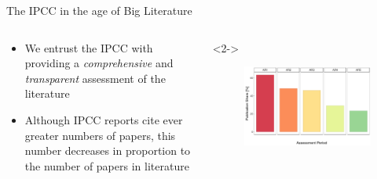 \documentclass[9pt, aspectratio=169]{beamer}
\begin{document}
\begin{frame}{The IPCC in the age of Big Literature}

\begin{columns}
	\begin{column}{0.382\linewidth}
		\begin{itemize}
			\item<1->We entrust the IPCC with providing a \textit{comprehensive} and \textit{transparent} assessment of the literature 
			\item<2->Although IPCC reports cite ever greater numbers of papers, this number decreases in proportion to the number of papers in literature
			
		\end{itemize}
	\end{column}
	\begin{column}{0.618\linewidth}<2->
		\begin{figure}
			\includegraphics[width=\linewidth]{wos_IPCC_shares.png}
			\caption{\citep{Minx2017l}}
		\end{figure}
	\end{column}
\end{columns}

\end{frame}

\end{document}

